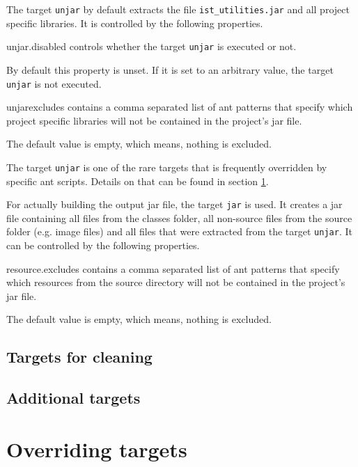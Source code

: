 \documentclass[a4paper,twoside,11pt,bibtotoc]{article}
\begin{document}
The target \texttt{unjar} by default extracts the file \texttt{ist_utilities.jar} and all project specific libraries.
It is controlled by the following properties.
\begin{description*}
	\item[unjar.disabled] controls whether the target \texttt{unjar} is executed or not.\par By default this property is unset. If it is set to an arbitrary value, the target \texttt{unjar} is not executed.
	\item[unjarexcludes] contains a comma separated list of ant patterns that specify which project specific libraries will not be contained in the project's jar file.\par The default value is empty, which means, nothing is excluded.
\end{description*}

The target \texttt{unjar} is one of the rare targets that is frequently overridden by specific ant scripts.
Details on that can be found in section \ref{sec:override}.

For actually building the output jar file, the target \texttt{jar} is used.
It creates a jar file containing all files from the classes folder, all non-source files from the source folder (e.g. image files) and all files that were extracted from the target \texttt{unjar}.
It can be controlled by the following properties.

\begin{description*}
	\item[resource.excludes] contains a comma separated list of ant patterns that specify which resources from the source directory will not be contained in the project's jar file.\par The default value is empty, which means, nothing is excluded.
\end{description*}



\subsection{Targets for cleaning}
\label{sec:cleaning}

\subsection{Additional targets}
\label{sec:additional}

\section{Overriding targets}
\label{sec:override}

\clearpage
 
%
%
%
\end{document}
